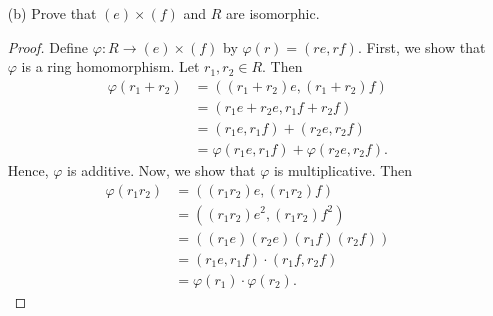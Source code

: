 \documentclass[a4paper]{article}
\begin{document}
\begin{problem}
\begin{enumerate}
\begin{proof}
                \[ (1 + f)x = (1+ f)(re) = re  +f(re) = re + r(ef) = re + 0 = re. \]
                Since \( R  \) is a commutative ring, it follows that \( (1 + f)x = x(1 +f) \). Thus, we get that 
                \[  (1+e)x = x(1+e) = x. \]
                Similarly, we see that if \( x \in (f) \) is arbitrary, then \( x = r f  \) for some \( r \in R  \). Then   
                \[ (1 + e)x = (1+ e)(rf) = rf  +e(rf) = re + r(ef) = rf + 0 = rf. \]
                Since \( R  \) is a commutative ring, it follows that \( (1 + e)x = x(1 +e) \).
            \end{proof}
        \item[(b)] Prove that \( (e) \times (f) \) and \( R  \) are isomorphic.
            \begin{proof}
            Define \( \varphi : R \to (e) \times (f) \) by \( \varphi(r) = (re,rf) \). First, we show that \( \varphi  \) is a ring homomorphism. Let \( {r}_{1}, {r}_{2} \in R  \). Then
            \begin{align*}
                \varphi({r}_{1} + {r}_{2}) &= (({r}_{1} + {r}_{2})e, ({r}_{1} + {r}_{2}) f)  \\
                                           &= ({r}_{1} e + {r}_{2} e, {r}_{1} f + {r}_{2} f ) \\
                                           &= ({r}_1 e, {r}_{1}f) + ({r}_{2} e, {r}_{2} f ) \\
                                           &= \varphi({r}_{1}e, {r}_{1} f) + \varphi({r}_{2}e, {r}_{2} f).   
            \end{align*}
            Hence, \( \varphi  \) is additive.
            Now, we show that \( \varphi  \) is multiplicative.
            Then    
            \begin{align*}
                \varphi({r}_{1}{r}_{2}) &= (({r}_{1}{r}_{2})e, ({r}_{1}{r}_{2})f ) \\
                                        &= (({r}_{1} {r}_{2}) e^{2}, ({r}_{1}{r}_{2})f^{2}) \\
                                        &= (({r}_{1}e) ({r}_{2} e) ({r}_{1}f)({r}_{2}f)) \\
                                        &= ({r}_{1}e, {r}_{1}f) \cdot ({r}_{1}f, {r}_{2}f) \\
                                        &= \varphi({r}_{1}) \cdot \varphi({r}_{2}).
            \end{align*}


\end{proof}
\end{enumerate}
\end{problem}
\end{document}
